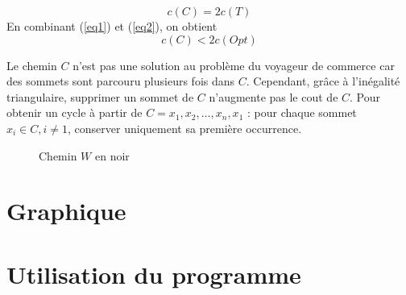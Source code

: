 \documentclass[a4paper,11pt]{article}
\begin{document}
\begin{equation}
c(C) = 2c(T)
\label{eq2}
\end{equation}
En combinant (\ref{eq1}) et (\ref{eq2}), on obtient
\begin{equation}
c(C) < 2c(Opt)
\label{eq2}
\end{equation}

Le chemin $C$ n'est pas une solution au problème du voyageur de commerce car des sommets sont parcouru plusieurs fois dans $C$. Cependant, grâce à l'inégalité triangulaire, supprimer un sommet de $C$ n’augmente pas le cout de $C$.
Pour obtenir un cycle à partir de $C = x_1, x_2, \ldots, x_n, x_1$ : 
pour chaque sommet $x_i \in C, i\neq1$, conserver uniquement sa première occurrence.

\begin{figure}[!h]
\centering
{}
\caption{Chemin $W$ en noir}
\end{figure}

\section{Graphique} %

\section{Utilisation du programme} %
\end{document}
